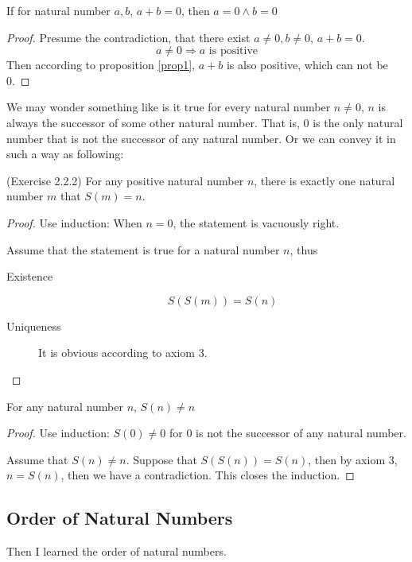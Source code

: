 \begin{coro}
If for natural number $a,b$, $a+b=0$, then $a=0 \wedge b=0$ \label{coro1}
\end{coro}
\begin{proof}
Presume the contradiction, that there exist $a \neq 0, b \neq 0$, $a+b=0$. 
\[
a \neq 0 \Longrightarrow a \text{ is positive}
\]
Then according to proposition \ref{prop1}, $a+b$ is also positive, which can not be 0. \qedhere
\end{proof}

We may wonder something like is it true for every natural number $n \neq 0$, $n$ is always the 
successor of some other natural number. That is, 0 is the only natural number that is not the successor 
of any natural number. Or we can convey it in such a way as following: 
\begin{prop}
(Exercise 2.2.2) \label{exercise2.2.2}
For any positive natural number $n$, there is exactly one natural number $m$ that $S(m) = n$. 
\label{prop5}
\end{prop} 

\begin{proof}
Use induction: When $n=0$, the statement is vacuously right.

Assume that the statement is true for a natural number $n$, thus
\begin{description}
\item[Existence] 
\[
S(S(m)) = S(n)
\]
\item[Uniqueness]
It is obvious according to axiom 3.
\end{description}
\end{proof}

\begin{prop}
For any natural number $n$, $S(n) \neq n$
\end{prop}
\begin{proof}
Use induction: $S(0) \neq 0$ for 0 is not the successor of any natural number.

Assume that $S(n) \neq n$. Suppose that $S(S(n)) = S(n)$, then by axiom 3, $n=S(n)$, then we have a 
contradiction. This closes the induction. \qedhere
\end{proof}

\subsection{Order of Natural Numbers}
Then I learned the order of natural numbers.

